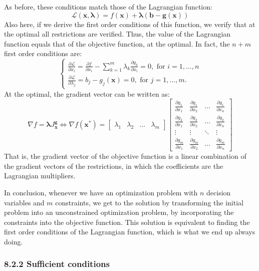 \documentclass[0pt, a4paper]{article}
\newcommand{\Lagr}{\mathcal{L}}
\begin{document}
As before, these conditions match those of the Lagrangian function:
$$\Lagr(\textbf{x},\boldsymbol{\lambda})=f(\textbf{x})+\boldsymbol{\lambda}(\textbf{b}-\textbf{g}(\textbf{x}))$$
Also here, if we derive the first order conditions of this function, we verify that at the optimal all restrictions are verified. Thus, the value of the Lagrangian function equals that of the objective function, at the optimal. In fact, the $n+m$ first order conditions are:
$$
\begin{cases}
\frac{\partial \Lagr}{\partial x_i}=\frac{\partial f}{\partial x_i}-\sum_{k=1}^m\lambda_k\frac{\partial g_k}{\partial x_i}=0,\text{ for }i=1,\dots,n\\
\frac{\partial \Lagr}{\partial \lambda_j}=b_j-g_j(\textbf{x})=0,\text{ for }j=1,\dots,m.
\end{cases}
$$
At the optimal, the gradient vector can be written as:
$$
\nabla f = \boldsymbol{\lambda}J^\textbf{g}_\textbf{x}\Leftrightarrow\nabla f(\textbf{x}^*)=
\begin{bmatrix}
\lambda_1 & \lambda_2 & \dots & \lambda_m
\end{bmatrix}
\begin{bmatrix}
\frac{\partial g_1}{\partial x_1} & \frac{\partial g_1}{\partial x_2} & \dots & \frac{\partial g_1}{\partial x_n}\\ 
\frac{\partial g_2}{\partial x_1} & \frac{\partial g_2}{\partial x_2} & \dots & \frac{\partial g_2}{\partial x_n}\\ 
\vdots & \vdots & \ddots & \vdots\\ 
\frac{\partial g_m}{\partial x_1} & \frac{\partial g_m}{\partial x_2} & \dots & \frac{\partial g_m}{\partial x_n}
\end{bmatrix}
$$
That is, the gradient vector of the objective function is a linear combination of the gradient vectors of the restrictions, in which the coefficients are the Lagrangian multipliers.

In conclusion, whenever we have an optimization problem with $n$ decision variables and $m$ constraints, we get to the solution by transforming the initial problem into an unconstrained optimization problem, by incorporating the constraints into the objective function. This solution is equivalent to finding the first order conditions of the Lagrangian function, which is what we end up always doing.

\subsubsection*{8.2.2 Sufficient conditions}
\end{document}

